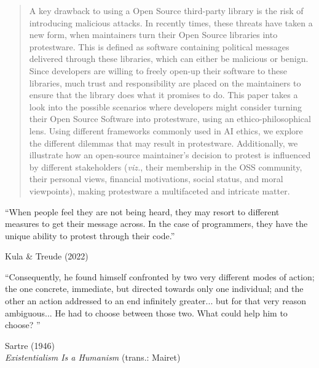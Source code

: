 \documentclass[journal,twocolumn]{IEEEtran}
\begin{document}
\maketitle

\begin{abstract}
A key drawback to using a Open Source third-party library is the risk of introducing malicious attacks.
In recently times, these threats have taken a new form, when maintainers turn their Open Source libraries into protestware.
This is defined as software containing political messages delivered through these libraries, which can either be malicious or benign.
Since developers are willing to freely open-up their software to these libraries, much trust and responsibility are placed on the  maintainers to ensure that the library does what it promises to do.  
This paper takes a look into the possible scenarios where developers might consider turning their Open Source Software into protestware, using an ethico-philosophical lens.
Using different frameworks commonly used in AI ethics, we explore the different dilemmas that may result in protestware.
Additionally, we illustrate how an open-source maintainer's decision to protest is influenced by different stakeholders (\textit{viz.}, their membership in the OSS community, their personal views, financial motivations, social status, and moral viewpoints), making protestware a multifaceted and intricate matter.
\end{abstract}

\epigraph{``When people feel they are not being heard, they may resort to different measures to get their message across. In the case of programmers, they have the unique ability to protest through their code.''}{Kula \& Treude (2022) \cite{kula2022war}}

\epigraph{``Consequently, he found himself confronted by two very different modes of action; the one concrete, immediate, but directed towards only one individual; and the other an action addressed to an end infinitely greater... but for that very reason ambiguous... He had to choose between those two. What could help him to choose? ''}{ Sartre (1946)\\ \textit{Existentialism Is a Humanism} (trans.:  Mairet) \cite{SartreJean-Paul1948Eah}}
\end{document}

